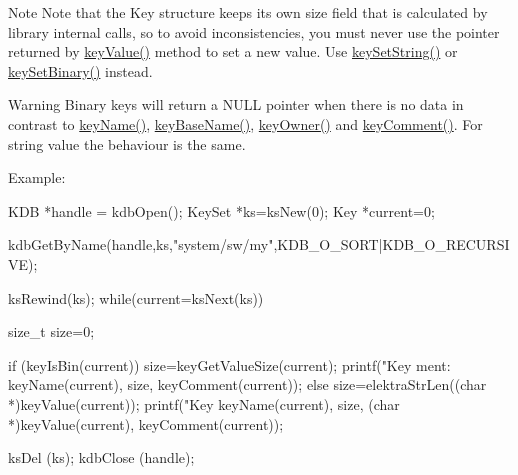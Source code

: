 \begin{DoxyNote}{Note}
Note that the Key structure keeps its own size field that is calculated by library internal calls, so to avoid inconsistencies, you must never use the pointer returned by \hyperlink{group__keyvalue_ga6f29609c5da53c6dc26a98678d5752af}{keyValue()} method to set a new value. Use \hyperlink{group__keyvalue_ga622bde1eb0e0c4994728331326340ef2}{keySetString()} or \hyperlink{group__keyvalue_gaa50a5358fd328d373a45f395fa1b99e7}{keySetBinary()} instead.
\end{DoxyNote}
\begin{DoxyWarning}{Warning}
Binary keys will return a NULL pointer when there is no data in contrast to \hyperlink{group__keyname_ga8e805c726a60da921d3736cda7813513}{keyName()}, \hyperlink{group__keyname_gaaff35e7ca8af5560c47e662ceb9465f5}{keyBaseName()}, \hyperlink{group__keyname_gaf6485fb8599714b6bbd830cf915ffea5}{keyOwner()} and \hyperlink{group__keyvalue_gac89fd319783b3457db45b4c09e55274a}{keyComment()}. For string value the behaviour is the same.
\end{DoxyWarning}
\begin{DoxyParagraph}{Example:}

\begin{DoxyCode}
KDB *handle = kdbOpen();
KeySet *ks=ksNew(0);
Key *current=0;

kdbGetByName(handle,ks,"system/sw/my",KDB_O_SORT|KDB_O_RECURSIVE);

ksRewind(ks);
while(current=ksNext(ks)) {
        size_t size=0;
        
        if (keyIsBin(current)) {
                size=keyGetValueSize(current);
                printf("Key %
      ment: %
                        keyName(current),
                        size,
                        keyComment(current));
        } else {
                size=elektraStrLen((char *)keyValue(current));
                printf("Key %
                        keyName(current),
                        size,
                        (char *)keyValue(current),
                        keyComment(current));
        }
}

ksDel (ks);
kdbClose (handle);
\end{DoxyCode}

\end{DoxyParagraph}

